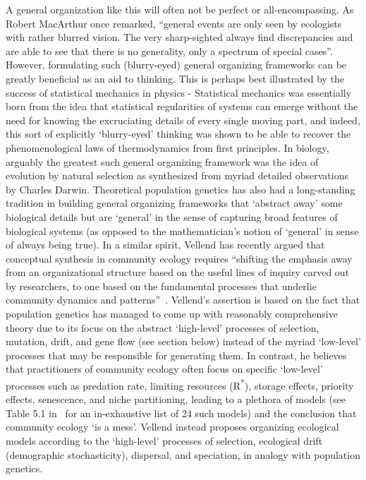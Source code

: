 A general organization like this will often not be perfect or all-encompassing. As Robert MacArthur once remarked, ``general events are only seen by ecologists with rather blurred vision. The very sharp-sighted always find discrepancies and are able to see that there is no generality, only a spectrum of special cases”\citep{kingsland_modeling_1985}. However, formulating such (blurry-eyed) general organizing frameworks can be greatly beneficial as an aid to thinking. This is perhaps best illustrated by the success of statistical mechanics in physics - Statistical mechanics was essentially born from the idea that statistical regularities of systems can emerge without the need for knowing the excruciating details of every single moving part, and indeed, this sort of explicitly `blurry-eyed' thinking was shown to be able to recover the phenomenological laws of thermodynamics from first principles. In biology, arguably the greatest such general organizing framework was the idea of evolution by natural selection as synthesized from myriad detailed observations by Charles Darwin. Theoretical population genetics has also had a long-standing tradition in building general organizing frameworks that `abstract away' some biological details but are `general' in the sense of capturing broad features of biological systems (as opposed to the mathematician's notion of `general' in sense of always being true). In a similar spirit, Vellend has recently argued that conceptual synthesis in community ecology requires
``shifting the emphasis away from an organizational structure based on the useful lines of
inquiry carved out by researchers, to one based on the fundamental processes that underlie community dynamics and patterns''~\citep{vellend_theory_2016}. Vellend's assertion is based on the
fact that population genetics has managed to come up  with reasonably comprehensive theory due to its focus on the abstract `high-level’ processes of selection, mutation, drift, and
gene flow (see section below) instead of the myriad `low-level' processes that may be responsible for generating them. In contrast, he believes that practitioners of community ecology often focus on
specific `low-level' processes such as predation rate, limiting resources (R\textsuperscript{*}), storage effects,
priority effects, senescence, and niche partitioning, leading to a plethora of models (see Table
5.1 in~\cite{vellend_theory_2016} for an in-exhaustive list of 24 such models) and the conclusion that
community ecology `is a mess'. Vellend instead proposes organizing ecological models according to
 the `high-level’ processes of selection, ecological drift (demographic stochasticity), dispersal,
and speciation, in analogy with population genetics.

